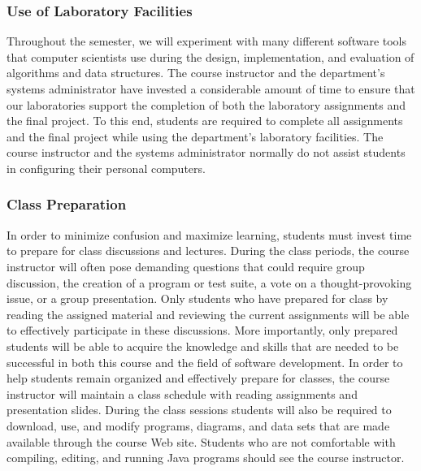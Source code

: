 \subsubsection*{Use of Laboratory Facilities}

Throughout the semester, we will experiment with many different software tools that computer scientists use during the
design, implementation, and evaluation of algorithms and data structures.  The course instructor and the department's
systems administrator have invested a considerable amount of time to ensure that our laboratories support the completion
of both the laboratory assignments and the final project.  To this end, students are required to complete all
assignments and the final project while using the department's laboratory facilities. The course instructor and the
systems administrator normally do not assist students in configuring their personal computers.

\subsubsection*{Class Preparation}

% 

In order to minimize confusion and maximize learning, students must invest time to prepare for class discussions and
lectures.  During the class periods, the course instructor will often pose demanding questions that could require group
discussion, the creation of a program or test suite, a vote on a thought-provoking issue, or a group presentation.
Only students who have prepared for class by reading the assigned material and reviewing the current assignments will be
able to effectively participate in these discussions.  More importantly, only prepared students will be able to acquire
the knowledge and skills that are needed to be successful in both this course and the field of software development.  In
order to help students remain organized and effectively prepare for classes, the course instructor will maintain a class
schedule with reading assignments and presentation slides.   During the class sessions students will also be required to
download, use, and modify programs, diagrams, and data sets that are made available through the course Web site.
Students who are not comfortable with compiling, editing, and running Java programs should see the course instructor.


